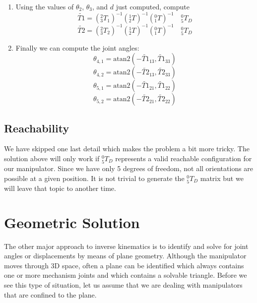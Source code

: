 \begin{ExampleCont}
\begin{enumerate}
\item
Using the values of $\theta_2$, $\theta_3$, and $d$ just computed, compute
\[
\tilde{T1} = (^2_3T_1)^{-1} (^1_2T)^{-1}   (^0_1T)^{-1}  \quad {^0_5T_D}
\]
\[
\tilde{T2} = (^2_3T_2)^{-1} (^1_2T)^{-1}   (^0_1T)^{-1}  \quad {^0_5T_D}
\]


\item Finally we can compute the joint angles:
\[
\theta_{4,1} = \mathrm{atan2}(-\tilde{T1}_{13}, \tilde{T1}_{33})
\]
\[
\theta_{4,2} = \mathrm{atan2}(-\tilde{T2}_{13}, \tilde{T2}_{33})
\]
\[
\theta_{5,1} =\mathrm{atan2}(-\tilde{T1}_{21}, \tilde{T1}_{22})
\]
\[
\theta_{5,2} =\mathrm{atan2}(-\tilde{T2}_{21}, \tilde{T2}_{22})
\]
\end{enumerate}

\end{ExampleCont}
\begin{ExampleCont}


\subsection*{Reachability}

We have skipped one last detail which makes the problem a bit more tricky.   The solution above
will only work if $^0_5T_D$ represents a valid reachable configuration for our manipulator.
Since we have only 5 degrees of freedom, not all orientations are possible at a given position.
It is not trivial to generate the $^0_5T_D$ matrix but we will leave that topic to another time.

\end{ExampleCont}








\section{Geometric Solution}

The other major approach to inverse kinematics is to identify and solve for joint angles or displacements by means of plane geometry.  Although the manipulator moves through 3D space, often a plane can be identified which always contains one or more mechanism joints and which contains a solvable triangle.  Before we see this type of situation, let us assume that we are dealing with manipulators that are confined to the plane.

